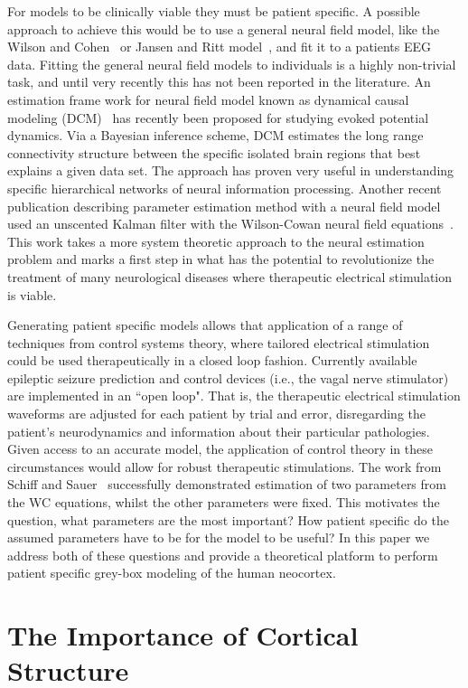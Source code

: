 \documentclass[onecolumn,draftcls]{IEEEtran}
\begin{document}
For models to be clinically viable they must be patient specific. A possible approach to achieve this would be to use a general neural field model, like the Wilson and Cohen~\cite{Wilson1973} or Jansen and Ritt model~\cite{Jansen1995}, and fit it to a patients EEG data. Fitting the general neural field models to individuals is a highly non-trivial task, and until very recently this has not been reported in the literature. An estimation frame work for neural field model known as dynamical causal modeling (DCM)~\cite{David2003} \cite{David2006} has recently been proposed for studying evoked potential dynamics. Via a Bayesian inference scheme, DCM estimates the long range connectivity structure between the specific isolated brain regions that best explains a given data set. The approach has proven very useful in understanding specific hierarchical networks of neural information processing. Another recent publication describing parameter estimation method with a neural field model used an unscented Kalman filter with the Wilson-Cowan neural field equations~\cite{schiff2008kalman}.  This work takes a more system theoretic approach to the neural estimation problem and marks a first step in what has the potential to revolutionize the treatment of many neurological diseases where therapeutic electrical stimulation is viable.

Generating patient specific models allows that application of a range of techniques from control systems theory, where tailored electrical stimulation could be used therapeutically in a closed loop fashion.  Currently available epileptic seizure prediction and control devices (i.e., the vagal nerve stimulator) are implemented in an ``open loop".  That is, the therapeutic electrical stimulation waveforms are adjusted for each patient by trial and error, disregarding the patient's neurodynamics and information about their particular pathologies. Given access to an accurate model, the application of control theory in these circumstances would allow for robust therapeutic stimulations.
The work from Schiff and Sauer~\cite{schiff2008kalman} successfully demonstrated  estimation of two parameters from the WC equations, whilst the other parameters were fixed. This motivates the question, what parameters are the most important? How patient specific do the assumed parameters have to be for the model to be useful? In this paper we address both of these questions and provide a theoretical platform to perform patient specific grey-box modeling of the human neocortex.

\section{The Importance of Cortical Structure}
\end{document}
